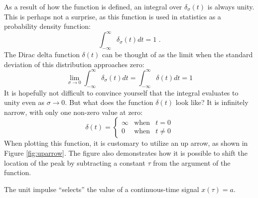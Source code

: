 As a result of how the function is defined, an integral over
$\delta_{\sigma}(t)$ is always unity. This is perhaps not a surprise,
as this function is used in statistics as a probability density
function:
\begin{equation}
\int_{-\infty}^{\infty}\delta_\sigma(t)dt = 1 \,\,.
\end{equation}
The Dirac delta function $\delta(t)$ can be thought of as the limit when the standard deviation of this distribution approaches zero:
\begin{equation}
\lim_{\sigma\rightarrow 0}  \int_{-\infty}^{\infty} \delta_\sigma(t) dt = \int_{-\infty}^{\infty} \delta(t) dt = 1
\end{equation}
It is hopefully not difficult to convince yourself that the integral
evaluates to unity even as $\sigma \rightarrow 0$. But what does the
function $\delta(t)$ look like? It is infinitely narrow, with only one non-zero value at zero:
\begin{equation}
\delta(t) = \left\{ \begin{array}{ccc}
\infty & \mathrm{when} & t=0\\
0 &  \mathrm{when} & t \ne 0
\end{array}\right.
\end{equation}
When plotting this function, it is customary to utilize an up arrow, as shown in Figure \ref{fig:uparrow}. The figure also demonstrates how it is possible to shift the location of the peak by subtracting a constant $\tau$ from the argument of the function.

\begin{marginfigure}[0cm]
\begin{center}
\end{center}
\caption{The unit impulse ``selects'' the value of a continuous-time signal $x(\tau)=a$.}
\end{marginfigure}

